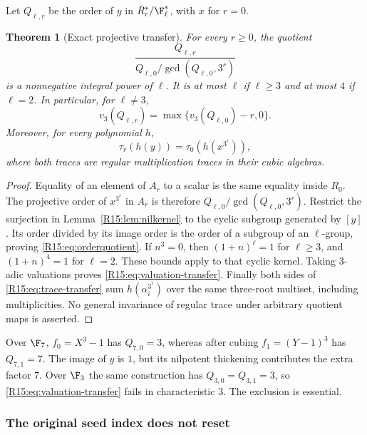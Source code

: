\documentclass[11pt,a4paper]{article}
\newtheorem{theorem}{Theorem}[section]
\theoremstyle{definition}\newtheorem{definition}[theorem]{Definition}
\theoremstyle{remark}\newtheorem{remark}[theorem]{Remark}
\begin{document}
Let $Q_{\ell,r}$ be the order of $y$ in $R_r^*/\F_\ell^*$,
with $x$ for $r=0$.
\begin{theorem}[Exact projective transfer]\label{R15:thm:transfer}
For every $r\ge0$, the quotient
\begin{equation}\label{R15:eq:orderquotient}
 \frac{Q_{\ell,r}}{Q_{\ell,0}/\gcd(Q_{\ell,0},3^r)}
\end{equation}
is a nonnegative integral power of $\ell$. It is at most $\ell$
if $\ell\ge3$ and at most $4$ if $\ell=2$.
In particular, for $\ell\ne3$,
\begin{equation}\label{R15:eq:valuation-transfer}
 v_3(Q_{\ell,r})=\max\{v_3(Q_{\ell,0})-r,0\}.
\end{equation}
Moreover, for every polynomial $h$,
\begin{equation}\label{R15:eq:trace-transfer}
 \tau_r(h(y))=\tau_0(h(x^{3^r})),
\end{equation}
where both traces are regular multiplication traces in their cubic
algebras.
\end{theorem}
\begin{proof}
Equality of an element of $A_r$ to a scalar is the same equality
inside $R_0$. The projective order of $x^{3^r}$ in $A_r$ is
therefore $Q_{\ell,0}/\gcd(Q_{\ell,0},3^r)$.
Restrict the surjection in Lemma~\ref{R15:lem:nilkernel} to the cyclic
subgroup generated by $[y]$. Its order divided by its image order
is the order of a subgroup of an $\ell$-group, proving
\eqref{R15:eq:orderquotient}. If $n^3=0$, then $(1+n)^\ell=1$
for $\ell\ge3$, and $(1+n)^4=1$ for $\ell=2$.
These bounds apply to that cyclic kernel. Taking $3$-adic valuations
proves \eqref{R15:eq:valuation-transfer}. Finally both sides of
\eqref{R15:eq:trace-transfer} sum $h(\alpha_i^{3^r})$ over the same
three-root multiset, including multiplicities. No general invariance
of regular trace under arbitrary quotient maps is asserted.
\end{proof}

Over $\F_7$, $f_0=X^3-1$ has $Q_{7,0}=3$, whereas after cubing
$f_1=(Y-1)^3$ has $Q_{7,1}=7$. The image of $y$ is $1$, but
its nilpotent thickening contributes the extra factor $7$.
Over $\F_3$ the same construction has $Q_{3,0}=Q_{3,1}=3$,
so \eqref{R15:eq:valuation-transfer} fails in characteristic $3$.
The exclusion is essential.

\subsubsection{The original seed index does not reset}
\end{document}

